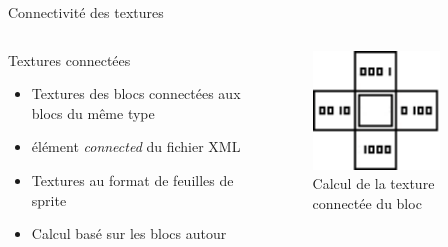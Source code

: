 \documentclass{beamer}
\begin{document}
{\begin{frame}{Connectivité des textures}
    \begin{columns}
            \begin{block}{Textures connectées}
                \begin{itemize}
                    \item[\bullet] Textures des blocs connectées aux blocs du même type
                    \item[\bullet] élément \emph{connected} du fichier XML
                    \item[\bullet] Textures au format de feuilles de sprite
                    \item[\bullet] Calcul basé sur les blocs autour
                \end{itemize}
            \end{block}
            \begin{figure}
                \centering
                \includegraphics[width=0.8\textwidth]{images/connected_textures_offset_computing}
                \caption{Calcul de la texture connectée du bloc}
            \end{figure}
    \end{columns}
\end{frame}

}
\end{document}
